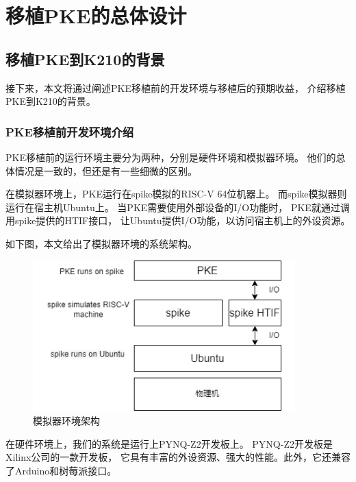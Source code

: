 
\chapter{移植PKE的总体设计}

\section{移植PKE到K210的背景}

接下来，本文将通过阐述PKE移植前的开发环境与移植后的预期收益，
介绍移植PKE到K210的背景。

\subsection{PKE移植前开发环境介绍}

PKE移植前的运行环境主要分为两种，分别是硬件环境和模拟器环境。
他们的总体情况是一致的，但还是有一些细微的区别。

在模拟器环境上，PKE运行在spike模拟的RISC-V 64位机器上。
而spike模拟器则运行在宿主机Ubuntu上。
当PKE需要使用外部设备的I/O功能时，
PKE就通过调用spike提供的HTIF接口，
让Ubuntu提供I/O功能，以访问宿主机上的外设资源。

如下图，本文给出了模拟器环境的系统架构。

\begin{figure}[htbp]
    \vspace{13pt} %
    \centering
    \includegraphics[width=0.9\textwidth]{images/spike_structure.png}
    \caption{模拟器环境架构}\label{模拟器环境架构} %
\end{figure}

在硬件环境上，我们的系统是运行上PYNQ-Z2开发板上。
PYNQ-Z2开发板是Xilinx公司的一款开发板，
它具有丰富的外设资源、强大的性能。此外，它还兼容了Arduino和树莓派接口。

